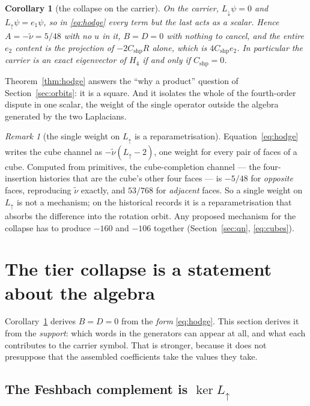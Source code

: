\documentclass[11pt]{article}
\newtheorem{corollary}[theorem]{Corollary}
\theoremstyle{definition}
\theoremstyle{remark}
\newtheorem{remark}[theorem]{Remark}
\newcommand{\Ldn}{L_{\downarrow}}
\newcommand{\Lup}{L_{\uparrow}}
\newcommand{\chk}[1]{}
\begin{document}
\begin{corollary}[the collapse on the carrier]\label{cor:carrier}
On the carrier, $\Ldn\psi=0$ and $\Lup\psi=e_1\psi$, so in \eqref{eq:hodge}
every term but the last acts as a scalar. Hence $A=-\tilde\nu=5/48$ with no $u$
in it, $B=D=0$ with nothing to cancel, and the entire $e_2$ content is the
projection of $-2C_{\mathrm{shp}}R$ alone, which is $4C_{\mathrm{shp}}e_2$. In
particular the carrier is an exact eigenvector of $H_4$ if and only if
$C_{\mathrm{shp}}=0$.\chk{C\_shp = -5/96 - u - (rho + pi)/2, exactly}
\end{corollary}

Theorem~\ref{thm:hodge} answers the ``why a product'' question of
Section~\ref{sec:orbits}: it is a square. And it isolates the whole of the
fourth-order dispute in one scalar, the weight of the single operator outside
the algebra generated by the two Laplacians.

\begin{remark}[the single weight on $\Lup$ is a reparametrisation]
Equation~\eqref{eq:hodge} writes the cube channel as $-\tilde\nu(\Lup-2)$, one
weight for every pair of faces of a cube. Computed from primitives, the
cube-completion channel --- the four-insertion histories that are the cube's
other four faces --- is $-5/48$ for \emph{opposite} faces, reproducing
$\tilde\nu$ exactly, and $53/768$ for \emph{adjacent} faces. So a single weight
on $\Lup$ is not a mechanism; on the historical records it is a
reparametrisation that absorbs the difference into the rotation orbit. Any
proposed mechanism for the collapse has to produce $-160$ and $-106$ together
(Section~\ref{sec:qn}, \eqref{eq:cubes}).\chk{the cube completion from the third engine: -5/48 between opposite faces, -53/768 between adjacent ones}
\end{remark}

\section{The tier collapse is a statement about the algebra}\label{sec:collapse}

Corollary~\ref{cor:carrier} derives $B=D=0$ from the \emph{form}
\eqref{eq:hodge}. This section derives it from the \emph{support}: which words
in the generators can appear at all, and what each contributes to the carrier
symbol. That is stronger, because it does not presuppose that the assembled
coefficients take the values they take.

\subsection{The Feshbach complement is $\ker\Lup$}
\end{document}
